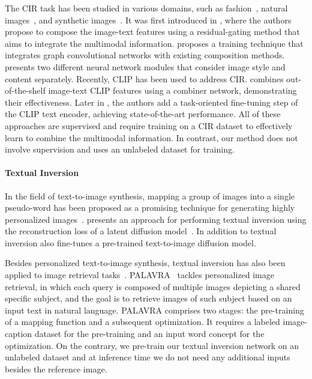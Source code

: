 \documentclass[10pt,twocolumn,letterpaper]{article}
\begin{document}
The CIR task has been studied in various domains, such as fashion~\cite{berg2010automatic, han2017automatic, wu2021fashion, guo2018dialog}, natural images~\cite{forbes2019neural, liu2021image}, and synthetic images~\cite{vo2019composing}. It was first introduced in \cite{vo2019composing}, where the authors propose to compose the image-text features using a residual-gating method that aims to integrate the multimodal information. 
\cite{shin2021rtic} proposes a training technique that integrates graph convolutional networks with existing composition methods. \cite{lee2021cosmo} presents two different neural network modules that consider image style and content separately.
Recently, CLIP has been used to address CIR. \cite{baldrati2022effective} combines out-of-the-shelf image-text CLIP features using a combiner network, demonstrating their effectiveness. Later in \cite{baldrati2022conditioned}, the authors add a task-oriented fine-tuning step of the CLIP text encoder, achieving state-of-the-art performance. All of these approaches are supervised and require training on a CIR dataset to effectively learn to combine the multimodal information. In contrast, our method does not involve supervision and uses an unlabeled dataset for training.

\paragraph{Textual Inversion}\label{sec:related_work_textual_inversion}
In the field of text-to-image synthesis, mapping a group of images into a single pseudo-word has been proposed as a promising technique for generating highly personalized images~\cite{gal2022image, ruiz2023dreambooth, kumari2022multi, daras2022multiresolution}.
\cite{gal2022image} presents an approach for performing textual inversion using the reconstruction loss of a latent diffusion model~\cite{rombach2022high}.
In addition to textual inversion \cite{ruiz2023dreambooth} also fine-tunes a pre-trained text-to-image diffusion model. 

Besides personalized text-to-image synthesis, textual inversion has also been applied to image retrieval tasks~\cite{cohen2022this,saito2023pic2word, korbar2022personalised}. PALAVRA~\cite{cohen2022this} tackles personalized image retrieval, in which each query is composed of multiple images depicting a shared specific subject, and the goal is to retrieve images of such subject based on an input text in natural language. PALAVRA comprises two stages: the pre-training of a mapping function and a subsequent optimization.  It requires a labeled image-caption dataset for the pre-training and an input word concept for the optimization. On the contrary, we pre-train our textual inversion network on an unlabeled dataset and at inference time we do not need any additional inputs besides the reference image.
 
\end{document}
